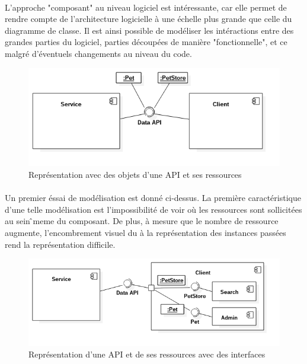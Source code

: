         \paragraph{}
            L'approche "composant" au niveau logiciel est intéressante, car elle permet de rendre compte
            de l'architecture logicielle à une échelle plus grande que celle du diagramme de classe.
            Il est ainsi possible de modéliser les intéractions entre des grandes parties du logiciel,
            parties découpées de manière "fonctionnelle", et ce malgré d'éventuels changements au niveau
            du code.

        \begin{figure}[h]
            \centering
            \includegraphics[scale=0.6]{./assets/UML/component1.png}
            \caption{Représentation avec des objets d'une API et ses ressources}
        \end{figure}

        \paragraph{}
            Un premier éssai de modélisation est donné ci-dessus. La première caractéristique d'une telle
            modélisation est l'impossibilité de voir où les ressources sont sollicitées au sein ̂meme
            du composant. De plus, à mesure que le nombre de ressource augmente,  l'encombrement visuel
            du à la représentation des instances passées rend la représentation difficile.

        \begin{figure}[h]
            \centering
            \includegraphics[scale=0.6]{./assets/UML/component3.png}
            \caption{Représentation d'une API et de ses ressources avec des interfaces}
        \end{figure}

